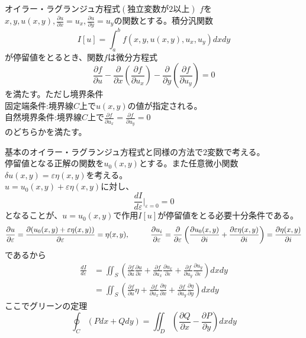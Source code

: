 \documentclass{jsarticle}
\begin{document}
\begin{itembox}[l]{オイラー・ラグランジュ方程式\((独立変数が2以上)\)}
\(f\)を\(x,y,u(x,y),\frac{\partial u}{\partial x}=u_{x},\frac{\partial u}{\partial y}=u_{y}\)の関数とする。積分汎関数
\[I[u]=\int_{a}^{b}f(x,y,u(x,y),u_{x},u_{y})dxdy\]
が停留値をとるとき、関数\(f\)は微分方程式
\[\frac{\partial f}{\partial u}-\frac{\partial}{\partial x}\left(\frac{\partial f}{\partial u_{x}}\right)-\frac{\partial}{\partial y}\left(\frac{\partial f}{\partial u_{y}}\right)=0\]
を満たす。ただし境界条件\\
固定端条件:\hspace{5mm}境界線\(C\)上で\(u(x,y)\)の値が指定される。\\
自然境界条件:\hspace{5mm}境界線\(C\)上で\(\frac{\partial f}{\partial u_{x}}=\frac{\partial f}{\partial u_{y}}=0\)\\
のどちらかを満たす。
\end{itembox}
基本のオイラー・ラグランジュ方程式と同様の方法で\(2\)変数で考える。\\
停留値となる正解の関数を\(u_{0}(x,y)\)とする。また任意微小関数\(\delta u(x,y)=\varepsilon\eta(x,y)\)を考える。\\
\(u=u_{0}(x,y)+\varepsilon\eta(x,y)\)に対し、
\[\frac{dI}{d\varepsilon}\Big|_{\varepsilon=0}=0\]
となることが、\(u=u_{0}(x,y)\)で作用\(I[u]\)が停留値をとる必要十分条件である。\\
\[\frac{\partial u}{\partial\varepsilon}=\frac{\partial(u_{0}(x,y)+\varepsilon\eta(x,y))}{\partial\varepsilon}=\eta(x,y),\hspace{10mm}\frac{\partial u_{i}}{\partial\varepsilon}=\frac{\partial}{\partial\varepsilon}\left(\frac{\partial u_{0}(x,y)}{\partial i}+\frac{\partial\varepsilon\eta(x,y)}{\partial i}\right)=\frac{\partial\eta(x,y)}{\partial i}\]
であるから
\begin{align*}
\frac{dI}{d\varepsilon}&=\iint_{S}\left(\frac{\partial f}{\partial u}\frac{\partial u}{\partial\varepsilon}+\frac{\partial f}{\partial u_{x}}\frac{\partial u_{x}}{\partial\varepsilon}+\frac{\partial f}{\partial u_{y}}\frac{\partial u_{y}}{\partial\varepsilon}\right)dxdy\\
&=\iint_{S}\left(\frac{\partial f}{\partial u}\eta+\frac{\partial f}{\partial u_{x}}\frac{\partial\eta}{\partial x}+\frac{\partial f}{\partial u_{y}}\frac{\partial\eta}{\partial y}\right)dxdy
\end{align*}
ここでグリーンの定理
\[\oint_{C}\left(Pdx+Qdy\right)=\iint_{D}\left(\frac{\partial Q}{\partial x}-\frac{\partial P}{\partial y}\right)dxdy\]
\end{document}
